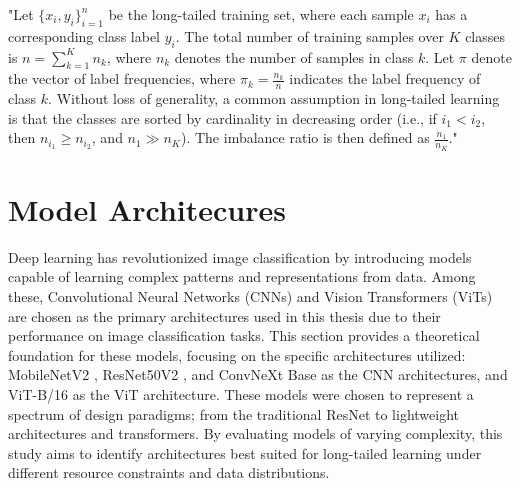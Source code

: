 "Let $\{x_i, y_i\}_{i=1}^n$ be the long-tailed training set, where each sample $x_i$ has a corresponding class label $y_i$. The total number of training samples over $K$ classes is $n = \sum_{k=1}^K n_k$, where $n_k$ denotes the number of samples in class $k$. Let $\pi$ denote the vector of label frequencies, where $\pi_k = \frac{n_k}{n}$ indicates the label frequency of class $k$. Without loss of generality, a common assumption in long-tailed learning \cite{31, 32} is that the classes are sorted by cardinality in decreasing order (i.e., if $i_1 < i_2$, then $n_{i_1} \geq n_{i_2}$, and $n_1 \gg n_K$). The imbalance ratio is then defined as $\frac{n_1}{n_K}$." \cite{zhang2023deep}



\section{Model Architecures}
\label{sec:model_arch}
Deep learning has revolutionized image classification by introducing models capable of learning complex patterns and representations from data. Among these, Convolutional Neural Networks (CNNs) and Vision Transformers (ViTs) are chosen as the primary architectures used in this thesis due to their performance on image classification tasks. This section provides a theoretical foundation for these models, focusing on the specific architectures utilized: MobileNetV2 \cite{sandler2018mobilenetv2}, ResNet50V2 \cite{he2015deepresiduallearningimage}, and ConvNeXt Base \cite{todi2023convnext} as the CNN architectures, and ViT-B/16 \cite{dosovitskiy2021imageworth16x16words} as the ViT architecture.
These models were chosen to represent a spectrum of design paradigms; from the traditional ResNet to lightweight architectures and transformers. By evaluating models of varying complexity, this study aims to identify architectures best suited for long-tailed learning under different resource constraints and data distributions.


